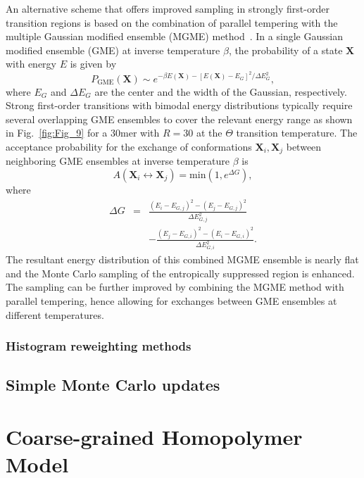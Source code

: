 \documentclass[12pt]{report}
\begin{document}
An alternative scheme that offers improved sampling in strongly first-order
transition regions is based on the combination of parallel tempering with
the
multiple Gaussian modified ensemble (MGME) 
method~\cite{Neuhaus2006}. In a single Gaussian modified ensemble
(GME)
at inverse temperature $\beta$, the probability of a state $\mathbf{X}$
with energy $E$ is given by
\begin{equation}
P_{\mathrm{GME}}(\mathbf{X}) \sim e^{-\beta E(\mathbf{X}) -
\left[E(\mathbf{X}) - E_{G}\right]^{2} / \Delta E_{G}^{2}},
\end{equation}
where $E_G$ and $\Delta E_G$ are the center and the width of the
Gaussian, respectively. 
Strong first-order transitions with bimodal energy distributions typically
require several overlapping GME ensembles to cover the relevant energy
range
as shown in Fig.~\ref{fig:Fig_9} for a 30mer with $R=30$ at
the $\Theta$ transition temperature. The acceptance probability for the
exchange of
conformations $\mathbf{X}_{i} , \mathbf{X}_{j}$ between neighboring GME
ensembles at inverse temperature $\beta$ is
\begin{equation}
A\left(\mathbf{X}_{i} \leftrightarrow \mathbf{X}_{j}\right) = 	
\mathrm{min}\left(1,e^{\Delta G}\right),
\end{equation}
where
\begin{eqnarray}
\Delta G  &=& 
\frac{\left(E_{i} - E_{G,j}\right)^{2}-\left(E_{j}-
E_{G,j}\right)^{2}}{\Delta E_{G,j}^{2}}  \nonumber \\
&&- \frac{\left(E_{j} - 	
E_{G,i}\right)^{2}-\left(E_{i} - E_{G,i}\right)^{2}}{\Delta E_{G,i}^{2}}.
\end{eqnarray}
The resultant energy distribution of this combined MGME ensemble is nearly
flat and the Monte Carlo sampling of the entropically suppressed region is
enhanced. The sampling can be further improved by combining the MGME method
with parallel tempering, hence allowing for exchanges between GME ensembles
at
different temperatures. 


\subsection{Histogram reweighting methods}
\section{Simple Monte Carlo updates}




\chapter{Coarse-grained Homopolymer Model}
\end{document}
